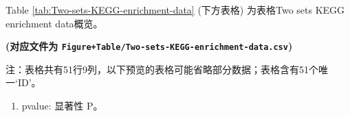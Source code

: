 \documentclass[
]{article}
\providecommand{\tightlist}{%
  \setlength{\itemsep}{0pt}\setlength{\parskip}{0pt}}
\begin{document}
Table \ref{tab:Two-sets-KEGG-enrichment-data} (下方表格) 为表格Two sets KEGG enrichment data概览。

\textbf{(对应文件为 \texttt{Figure+Table/Two-sets-KEGG-enrichment-data.csv})}

\begin{center}\begin{tcolorbox}[colback=gray!10, colframe=gray!50, width=0.9\linewidth, arc=1mm, boxrule=0.5pt]注：表格共有51行9列，以下预览的表格可能省略部分数据；表格含有51个唯一`ID'。
\end{tcolorbox}
\end{center}
\begin{center}\begin{tcolorbox}[colback=gray!10, colframe=gray!50, width=0.9\linewidth, arc=1mm, boxrule=0.5pt]\begin{enumerate}\tightlist
\item pvalue: 显著性 P。
\end{enumerate}\end{tcolorbox}
\end{center}
\end{document}
